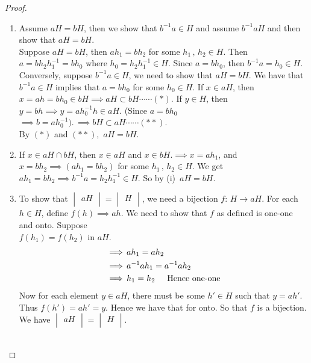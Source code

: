 \documentclass[11pt,a4paper]{article}
\theoremstyle{definition}
\begin{document}
\begin{proof}
\begin{enumerate}
\item[(i)] Assume $a H = b H$, then  we show that $b^{-1}a\in H$ and assume $b^{-1}aH$ and then show that $aH = bH$.\\
Suppose $a H = b H$, then $ah_1 = bh_2$ for some $h_1\, , \, h_2\in H$. Then $a = bh_2h^{-1}_1 = bh_0$ where $h_0 = h_2h^{-1}_1\in H$. Since $a = bh_0$, then $b^{-1}a = h_0\in H$.\\
Conversely, suppose $b^{-1}a\in H$, we need to show that $a H = b H$. We have that $b^{-1}a\in H$ implies that $a = bh_0$ for some $h_0\in H$. If $x\in aH$, then $x = ah = bh_0\in bH\implies aH \subset bH\cdots\cdots(*)$. If $y\in H$, then $y = bh\implies y = ah^{-1}_0h\in aH$. (Since $a = bh_0$\\ $\implies b = ah_0^{-1}).\, \implies bH\subset aH\cdots\cdots (**)$.\\
By $(*)$ and $(**),\, \, aH = bH$.\\


\item[(ii)] If $x\in aH \cap bH$, then $x\in aH$ and $x\in bH. \implies x = ah_1$, and $x = bh_2\implies (ah_1 = bh_2)$ for some $h_1\, , \, h_2\in H$. We get $ah_1 = bh_2\implies b^{-1}a = h_2h_1^{-1}\in H$. So by (i) $\, aH = bH$.\\


\item[(iii)] To show that $\begin{vmatrix}
aH\\
\end{vmatrix} = \begin{vmatrix}
H\\
\end{vmatrix}$, we need a bijection $f: \, H \longrightarrow aH$. For each $h\in H$, define $f(h) \implies ah$. We need to show that $f$ as defined is one-one and onto. Suppose\\ $f(h_1) = f(h_2)$ in $aH$.
\begin{align*}
\implies\, & ah_1 = ah_2\\
\implies\, & a^{-1}ah_1 = a^{-1}ah_2\\
\implies\, & h_1 = h_2\hspace{0.5cm} \text{Hence one-one}
\end{align*}
Now for each element $y\in aH$, there must be some $h'\in H$ such that $y = ah'$. Thus $f(h') = ah' = y$. Hence we have that for onto. So that $f$ is a bijection. We have $\begin{vmatrix}
aH\\
\end{vmatrix} = \begin{vmatrix}
H\\
\end{vmatrix}$.\\\\
\end{enumerate}
\end{proof}
\end{document}
